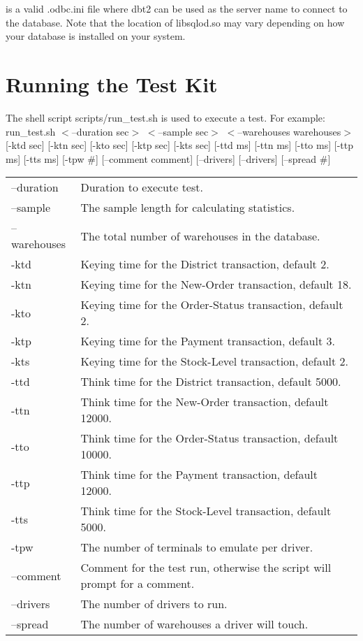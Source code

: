 \documentclass{article}
\begin{document}
is a valid .odbc.ini file where dbt2 can be used as the server name to
connect to the database.  Note that the location of libsqlod.so may vary
depending on how your database is installed on your system.

\section{Running the Test Kit}

The shell script scripts/run\_test.sh is used to execute a test.  For example:
	run\_test.sh $<$--duration sec$>$ $<$--sample sec$>$ $<$--warehouses warehouses$>$
		[-ktd sec] [-ktn sec] [-kto sec] [-ktp sec] [-kts sec] [-ttd ms]
		[-ttn ms] [-tto ms] [-ttp ms] [-tts ms] [-tpw \#] 
		[--comment comment] [--drivers] [--drivers] [--spread \#] \\
\begin{tabular}[c]{ll}
--duration & Duration to execute test. \\
--sample &The sample length for calculating statistics. \\
--warehouses & The total number of warehouses in the database. \\
-ktd & Keying time for the District transaction, default 2. \\
-ktn & Keying time for the New-Order transaction, default 18. \\
-kto & Keying time for the Order-Status transaction, default 2. \\
-ktp & Keying time for the Payment transaction, default 3. \\
-kts & Keying time for the Stock-Level transaction, default 2. \\
-ttd & Think time for the District transaction, default 5000. \\
-ttn & Think time for the New-Order transaction, default 12000. \\
-tto & Think time for the Order-Status transaction, default 10000. \\
-ttp & Think time for the Payment transaction, default 12000. \\
-tts & Think time for the Stock-Level transaction, default 5000. \\
-tpw & The number of terminals to emulate per driver. \\
--comment & Comment for the test run, otherwise the script will prompt for a comment. \\
--drivers & The number of drivers to run. \\
--spread & The number of warehouses a driver will touch. \\
\end{tabular}
\end{document}
